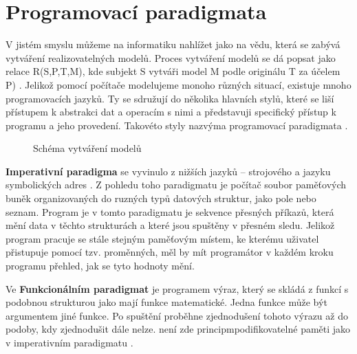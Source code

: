 \documentclass[FP,DP]{tulthesis}
\begin{document}
\section{Programovací paradigmata}
V jistém smyslu můžeme na informatiku nahlížet jako na vědu, která se zabývá vytváření realizovatelných modelů. Proces vytváření modelů se dá popsat jako relace R(S,P,T,M), kde subjekt S vytváři model M podle originálu T za účelem P) \citep*[s.~135]{didaktikderinformatik}. Jelikož pomocí počítače modelujeme monoho různých situací, existuje mnoho programovacích jazyků. Ty se sdružují do několika hlavních stylů, které se liší přístupem k abstrakci dat a operacím s nimi a představuji specifický přístup k programu a jeho provedení. Takovéto styly nazvýma programovací paradigmata \citep*[s.~286]{bolshakova}.
\begin{figure}[h!]
\centering
{}

\caption{Schéma vytváření modelů \citep*[s.~135]{didaktikderinformatik}} \label{modely}
\end{figure}

\textbf{Imperativní paradigma} se vyvinulo z nižších jazyků -- strojového a jazyku symbolických adres \citep*[s.~286]{bolshakova}. Z pohledu toho paradigmatu je počítač soubor paměťových buněk organizovaných  do ruzných typů datových struktur, jako pole nebo seznam.  Program je v tomto paradigmatu je sekvence přesných příkazů, která mění data v těchto strukturách a které jsou spuštěny v přesném sledu. Jelikož program pracuje se stále stejným paměťovým místem, ke kterému uživatel přistupuje pomocí tzv. proměnných, měl by mít programátor v každém kroku programu přehled, jak se tyto hodnoty mění. 


Ve \textbf{Funkcionálním paradigmat}
je programem výraz, který se skládá z funkcí s podobnou strukturou jako mají funkce matematické. Jedna funkce může být argumentem jiné funkce. Po spuštění proběhne zjednodušení tohoto výrazu až do podoby, kdy zjednodušit dále nelze.  není zde principmpodifikovatelné paměti jako v imperativním paradigmatu \citep*{skavrda}.
\end{document}
